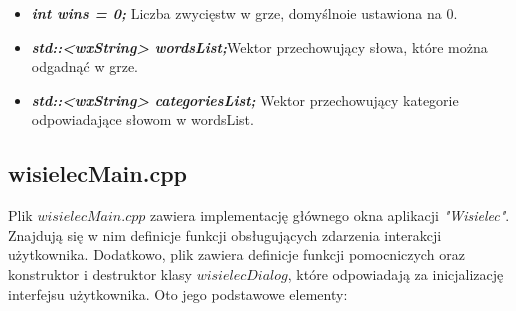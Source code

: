 \documentclass[]{report}
\begin{document}
\begin{itemize}
\begin{itemize}
		\item \textit{\textbf{int wins = 0;}} Liczba zwycięstw w grze, domyślnoie ustawiona na 0.
			
		\item \textit{\textbf{std::<wxString> wordsList;}}Wektor przechowujący słowa, które można odgadnąć w grze.
			
		\item \textit{\textbf{std::<wxString> categoriesList;}} Wektor przechowujący kategorie odpowiadające słowom w wordsList.
			
		\end{itemize}
		
	\end{itemize}
	
\newpage
	
\subsection*{wisielecMain.cpp}
	
Plik $wisielecMain.cpp$ zawiera implementację głównego okna aplikacji \textit{"Wisielec"}. Znajdują się w nim definicje funkcji obsługujących zdarzenia interakcji użytkownika. Dodatkowo, plik zawiera definicje funkcji pomocniczych oraz konstruktor i destruktor klasy $wisielecDialog$, które odpowiadają za inicjalizację interfejsu użytkownika. Oto jego podstawowe elementy:
\end{document}
